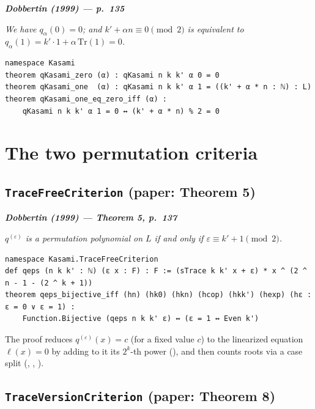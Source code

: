 \documentclass[11pt]{article}
\newenvironment{paperquote}[1]
 {\par\smallskip\noindent
  \def\FrameCommand{\color{quotebar}\vrule width 3pt\hspace{8pt}}%
  \MakeFramed{\advance\hsize-\width \FrameRestore}%
  \small\itshape
  \noindent\normalfont\footnotesize\textbf{\textsf{Dobbertin (1999) --- #1}}\par\nobreak\smallskip\itshape}
 {\endMakeFramed\par\smallskip}
\theoremstyle{definition}
\begin{document}
\begin{paperquote}{p.~135}
We have $q_\alpha(0)=0$; and $k'+\alpha n\equiv 0\pmod 2$ is equivalent to
$q_\alpha(1)=k'\cdot 1+\alpha\,\mathrm{Tr}(1)=0$.
\end{paperquote}

\begin{lstlisting}
namespace Kasami
theorem qKasami_zero (α) : qKasami n k k' α 0 = 0
theorem qKasami_one  (α) : qKasami n k k' α 1 = ((k' + α * n : ℕ) : L)
theorem qKasami_one_eq_zero_iff (α) :
    qKasami n k k' α 1 = 0 ↔ (k' + α * n) % 2 = 0
\end{lstlisting}

\section{The two permutation criteria}

\subsection{\texttt{TraceFreeCriterion} (paper: Theorem 5)}

\begin{paperquote}{Theorem 5, p.~137}
$q^{(\varepsilon)}$ is a permutation polynomial on $L$ if and only if
$\varepsilon\equiv k'+1\pmod 2$.
\end{paperquote}

\begin{lstlisting}
namespace Kasami.TraceFreeCriterion
def qeps (n k k' : ℕ) (ε x : F) : F := (sTrace k k' x + ε) * x ^ (2 ^ n - 1 - (2 ^ k + 1))
theorem qeps_bijective_iff (hn) (hk0) (hkn) (hcop) (hkk') (hexp) (hε : ε = 0 ∨ ε = 1) :
    Function.Bijective (qeps n k k' ε) ↔ (ε = 1 ↔ Even k')
\end{lstlisting}

The proof reduces $q^{(\varepsilon)}(x)=c$ (for a fixed value $c$) to the
linearized equation $\ell(x)=0$ by adding to it its $2^k$-th power
(), and then counts roots via a case split
(, , ).

\subsection{\texttt{TraceVersionCriterion} (paper: Theorem 8)}
\end{document}

